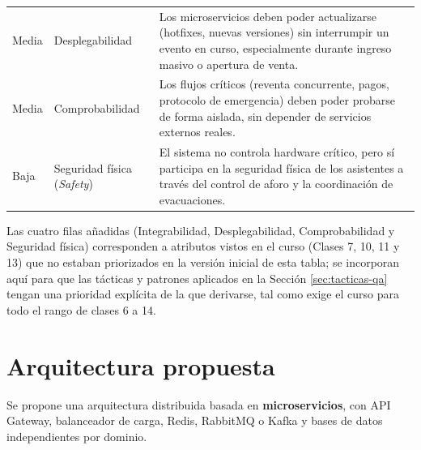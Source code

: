 \documentclass[12pt,a4paper]{article}
\begin{document}
\begin{longtable}{p{2cm}p{3cm}p{9cm}}
Media & Desplegabilidad & Los microservicios deben poder actualizarse (hotfixes, nuevas versiones) sin interrumpir un evento en curso, especialmente durante ingreso masivo o apertura de venta.\\
Media & Comprobabilidad & Los flujos críticos (reventa concurrente, pagos, protocolo de emergencia) deben poder probarse de forma aislada, sin depender de servicios externos reales.\\
Baja & Seguridad física (\textit{Safety}) & El sistema no controla hardware crítico, pero sí participa en la seguridad física de los asistentes a través del control de aforo y la coordinación de evacuaciones.\\
\bottomrule
\end{longtable}

Las cuatro filas añadidas (Integrabilidad, Desplegabilidad, Comprobabilidad y Seguridad física) corresponden a atributos vistos en el curso (Clases 7, 10, 11 y 13) que no estaban priorizados en la versión inicial de esta tabla; se incorporan aquí para que las tácticas y patrones aplicados en la Sección \ref{sec:tacticas-qa} tengan una prioridad explícita de la que derivarse, tal como exige el curso para todo el rango de clases 6 a 14.

\section{Arquitectura propuesta}

Se propone una arquitectura distribuida basada en \textbf{microservicios}, con API Gateway, balanceador de carga, Redis, RabbitMQ o Kafka y bases de datos independientes por dominio.
\end{document}
